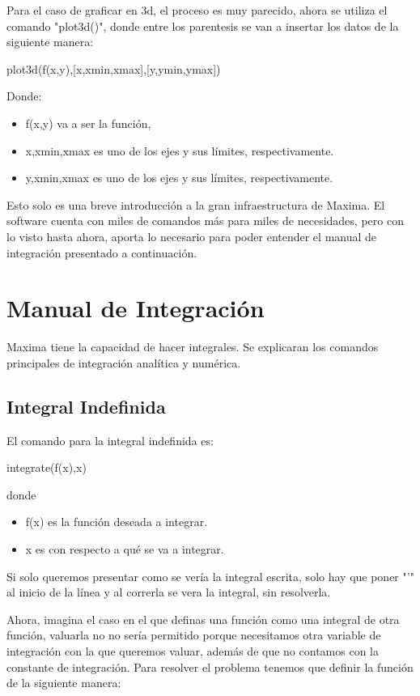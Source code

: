 \documentclass[a4paper]{article}
\begin{document}
Para el caso de graficar en 3d, el proceso es muy parecido, ahora se utiliza el comando "plot3d()", donde entre los parentesis se van a insertar los datos de la siguiente manera:
\begin{center}
plot3d(f(x,y),[x,xmin,xmax],[y,ymin,ymax])
\end{center}
Donde:
\begin{itemize}
\item f(x,y) va a ser la función,
\item x,xmin,xmax es uno de los ejes y sus límites, respectivamente.
\item y,xmin,xmax es uno de los ejes y sus límites, respectivamente.
\end{itemize}

\bigskip
\bigskip

Esto solo es una breve introducción a la gran infraestructura de Maxima. El software cuenta con miles de comandos más para miles de necesidades, pero con lo visto hasta ahora, aporta lo necesario para poder entender el manual de integración presentado a continuación.

\section{Manual de Integración}
Maxima tiene la capacidad de hacer integrales. Se explicaran los comandos principales de integración analítica y numérica.


\subsection{Integral Indefinida}

El comando para la integral indefinida es:

\begin{center}
integrate(f(x),x)
\end{center}

donde
\begin{itemize}
\item f(x) es la función deseada a integrar.
\item x es con respecto a qué se va a integrar. 
\end{itemize}

Si solo queremos presentar como se vería la integral escrita, solo hay que poner "'" al inicio de la línea y al correrla se vera la integral, sin resolverla.

Ahora, imagina el caso en el que definas una función como una integral de otra función, valuarla no no sería permitido porque necesitamos otra variable de integración con la que queremos valuar, además de que no contamos con la constante de integración. Para resolver el problema tenemos que definir la función de la siguiente manera:
\end{document}
